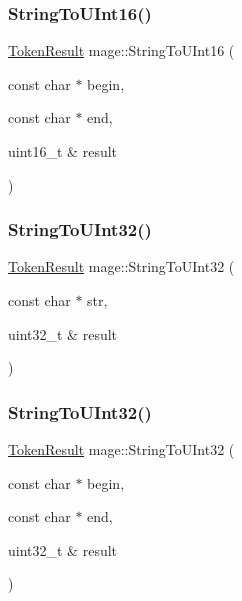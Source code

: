 \hypertarget{namespacemage_a12bd34f17d7d39ac8d054be9293efe54}{}\label{namespacemage_a12bd34f17d7d39ac8d054be9293efe54} 
\subsubsection{\texorpdfstring{String\+To\+U\+Int16()}{StringToUInt16()}\hspace{0.1cm}{\footnotesize\ttfamily [2/2]}}
{\footnotesize\ttfamily \hyperlink{namespacemage_a2178ba2411db5912f41b2e7698c2037d}{Token\+Result} mage\+::\+String\+To\+U\+Int16 (\begin{DoxyParamCaption}\item[{const char $\ast$}]{begin,  }\item[{const char $\ast$}]{end,  }\item[{uint16\+\_\+t \&}]{result }\end{DoxyParamCaption})}

\hypertarget{namespacemage_ac4f6357454f6870506e0fc102b745281}{}\label{namespacemage_ac4f6357454f6870506e0fc102b745281} 
\subsubsection{\texorpdfstring{String\+To\+U\+Int32()}{StringToUInt32()}\hspace{0.1cm}{\footnotesize\ttfamily [1/2]}}
{\footnotesize\ttfamily \hyperlink{namespacemage_a2178ba2411db5912f41b2e7698c2037d}{Token\+Result} mage\+::\+String\+To\+U\+Int32 (\begin{DoxyParamCaption}\item[{const char $\ast$}]{str,  }\item[{uint32\+\_\+t \&}]{result }\end{DoxyParamCaption})}

\hypertarget{namespacemage_ad84d36f8aaa4376d26b79a2fbd8fe22a}{}\label{namespacemage_ad84d36f8aaa4376d26b79a2fbd8fe22a} 
\subsubsection{\texorpdfstring{String\+To\+U\+Int32()}{StringToUInt32()}\hspace{0.1cm}{\footnotesize\ttfamily [2/2]}}
{\footnotesize\ttfamily \hyperlink{namespacemage_a2178ba2411db5912f41b2e7698c2037d}{Token\+Result} mage\+::\+String\+To\+U\+Int32 (\begin{DoxyParamCaption}\item[{const char $\ast$}]{begin,  }\item[{const char $\ast$}]{end,  }\item[{uint32\+\_\+t \&}]{result }\end{DoxyParamCaption})}

